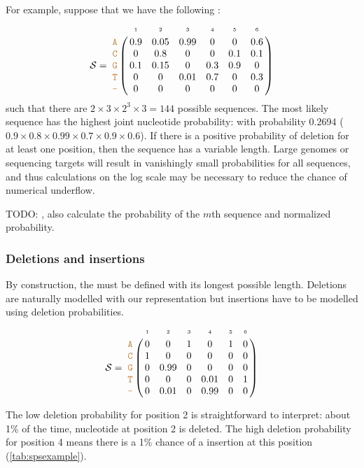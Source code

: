 \documentclass[10pt]{article}
\begin{document}
For example, suppose that we have the following \nlps:
$$
\nps = 
\bordermatrix{
& \scriptscriptstyle{1} & \scriptscriptstyle{2}& \scriptscriptstyle{3}& \scriptscriptstyle{4} & \scriptscriptstyle{5} & \scriptscriptstyle{6} \cr
\sq{A} & 0.9 & 0.05   & 0.99 & 0 & 0 & 0.6\cr
\sq{C} & 0   & 0.8 & 0 & 0 & 0.1 & 0.1\cr
\sq{G} & 0.1 & 0.15 & 0 & 0.3 & 0.9 & 0\cr
\sq{T} & 0 & 0 & 0.01 & 0.7 & 0 & 0.3\cr
\sq{-} & 0 & 0 & 0 & 0 & 0 & 0\cr
}
$$
such that there are $2\times 3 \times 2^3 \times 3 = 144$ possible sequences.
The most likely sequence has the highest joint nucleotide probability:  with probability 0.2694 ($0.9\times 0.8\times 0.99 \times 0.7 \times 0.9 \times 0.6$).
If there is a positive probability of deletion for at least one position, then the sequence has a variable length.
Large genomes or sequencing targets will result in vanishingly small probabilities for all sequences, and thus calculations on the log scale may be necessary to reduce the chance of numerical underflow.

TODO: , also calculate the probability of the $m$th sequence and normalized probability.


\subsubsection{Deletions and insertions}

By construction, the \nlps must be defined with its longest possible length.
Deletions are naturally modelled with our representation but insertions have to be modelled using deletion probabilities. 
\begin{equation}
\label{eq:indel}
\nps = 
\bordermatrix{
&\scriptscriptstyle{1} & \scriptscriptstyle{2}& \scriptscriptstyle{3}& \scriptscriptstyle{4} & \scriptscriptstyle{5} & \scriptscriptstyle{6} \cr
\sq{A} & 0 & 0   & 1 & 0    & 1 & 0\cr
\sq{C} & 1 & 0    & 0 & 0    & 0 & 0\cr
\sq{G} & 0 & 0.99 & 0 & 0    & 0 & 0\cr
\sq{T} & 0 & 0    & 0 & 0.01 & 0 & 1\cr
\sq{-} & 0 & 0.01 & 0 & 0.99 & 0 & 0\cr
}
\end{equation}

The low deletion probability for position 2 is straightforward to interpret: about 1\% of the time, nucleotide  at position 2 is deleted.
The high deletion probability for position 4 means there is a 1\% chance of a  insertion at this position (\autoref{tab:spsexample}).
\end{document}
